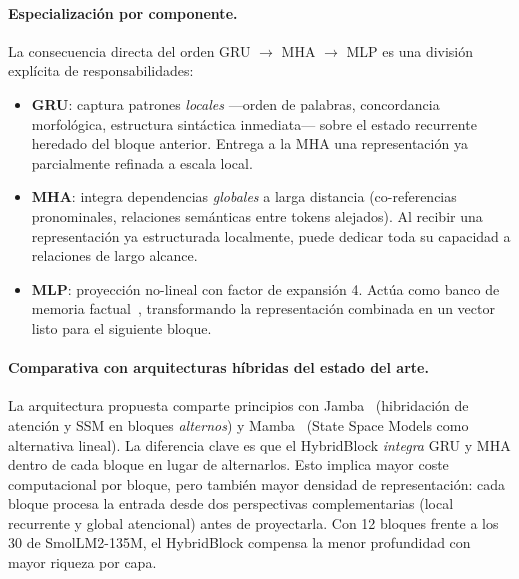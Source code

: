 \paragraph{Especialización por componente.}
La consecuencia directa del orden GRU $\to$ MHA $\to$ MLP es una división explícita de responsabilidades:

\begin{itemize}
    \item \textbf{GRU}: captura patrones \textit{locales} —orden de palabras, concordancia morfológica, estructura sintáctica inmediata— sobre el estado recurrente heredado del bloque anterior. Entrega a la MHA una representación ya parcialmente refinada a escala local.
    \item \textbf{MHA}: integra dependencias \textit{globales} a larga distancia (co-referencias pronominales, relaciones semánticas entre tokens alejados). Al recibir una representación ya estructurada localmente, puede dedicar toda su capacidad a relaciones de largo alcance.
    \item \textbf{MLP}: proyección no-lineal con factor de expansión 4. Actúa como banco de memoria factual~\cite{geva2021transformer}, transformando la representación combinada en un vector listo para el siguiente bloque.
\end{itemize}

\paragraph{Comparativa con arquitecturas híbridas del estado del arte.}
La arquitectura propuesta comparte principios con Jamba~\cite{lieber2024jamba} (hibridación de atención y SSM en bloques \textit{alternos}) y Mamba~\cite{gu2023mamba} (State Space Models como alternativa lineal). La diferencia clave es que el HybridBlock \textit{integra} GRU y MHA dentro de cada bloque en lugar de alternarlos. Esto implica mayor coste computacional por bloque, pero también mayor densidad de representación: cada bloque procesa la entrada desde dos perspectivas complementarias (local recurrente y global atencional) antes de proyectarla. Con 12 bloques frente a los 30 de SmolLM2-135M, el HybridBlock compensa la menor profundidad con mayor riqueza por capa.
